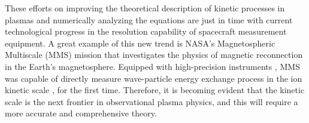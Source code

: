 \documentclass[12pt,a4paper,ruledheader]{report}
\begin{document}
These efforts on improving the theoretical description of kinetic processes in
plasmas and numerically analyzing the equations are just in time with current
technological progress in the resolution capability of spacecraft measurement
equipment. A great example of this new trend is NASA's Magnetospheric Multiscale
(MMS) mission that investigates the physics of magnetic reconnection in the
Earth's magnetosphere. Equipped with high-precision instruments \cite{Pollock2016,
  Torbert2016}, MMS was capable of directly measure wave-particle energy
exchange process in the ion kinetic scale \cite{Gershman2017}, for the first
time. Therefore, it is becoming evident that the kinetic scale is the next
frontier in observational plasma physics, and this will require a more accurate
and comprehensive theory.
\end{document}
